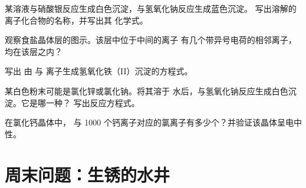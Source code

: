 \begin{exercise}[$\star\star$]\label{exo:g9:ions:8}
某溶液与硝酸银反应生成白色沉淀，与氢氧化钠反应生成蓝色沉淀。
写出溶解的离子化合物的名称，并写出其
化学式。
\end{exercise}

\begin{exercise}[$\star\star$]\label{exo:g9:ions:9}
观察食盐晶体层的图示。该层中位于中间的离子
有几个带异号电荷的相邻离子，
均在该层之内？
\end{exercise}

\begin{exercise}[$\star\star$]\label{exo:g9:ions:10}
写出
由  与  离子生成氢氧化铁（II）沉淀的方程式。
\end{exercise}

\begin{exercise}[$\star\star\star$]\label{exo:g9:ions:11}
某白色粉末可能是氯化锌或氯化钠。将其溶于
水后，与氢氧化钠反应生成白色沉淀。它是哪一种？
写出反应方程式。
\end{exercise}

\begin{exercise}[$\star\star\star$]\label{exo:g9:ions:12}
在氯化钙晶体中，
与 1000 个钙离子对应的氯离子有多少个？并验证该晶体呈电中性。
\end{exercise}

\section{周末问题：生锈的水井}

